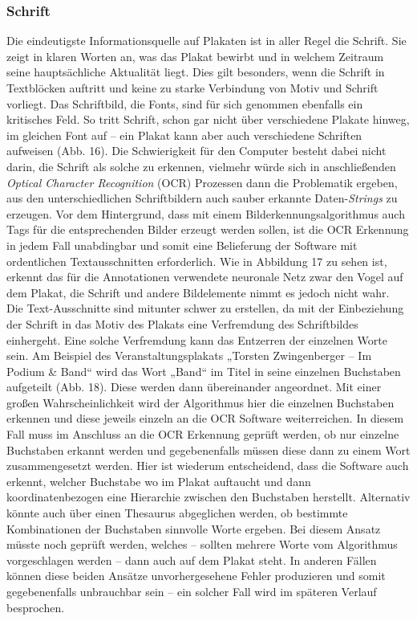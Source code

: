\documentclass[a4paper,12pt,ngerman]{article}
\begin{document}
\subsubsection{Schrift}
Die eindeutigste Informationsquelle auf Plakaten ist in aller Regel die Schrift. Sie zeigt in klaren Worten an, was das Plakat bewirbt und in welchem Zeitraum seine hauptsächliche Aktualität liegt. Dies gilt besonders, wenn die Schrift in Textblöcken auftritt und keine zu starke Verbindung von Motiv und Schrift vorliegt. Das Schriftbild, die Fonts, sind für sich genommen ebenfalls ein kritisches Feld. So tritt Schrift, schon gar nicht über verschiedene Plakate hinweg, im gleichen Font auf -- ein Plakat kann aber auch verschiedene Schriften aufweisen (Abb. 16). Die Schwierigkeit für den Computer besteht dabei nicht darin, die Schrift als solche zu erkennen, vielmehr würde sich in anschließenden \textit{Optical Character Recognition} (OCR) Prozessen dann die Problematik ergeben, aus den unterschiedlichen Schriftbildern auch sauber erkannte Daten-\textit{Strings} zu erzeugen. Vor dem Hintergrund, dass mit einem Bilderkennungsalgorithmus auch Tags für die entsprechenden Bilder erzeugt werden sollen, ist die OCR Erkennung in jedem Fall unabdingbar und somit eine Belieferung der Software mit ordentlichen Textausschnitten erforderlich. Wie in Abbildung 17 zu sehen ist, erkennt das für die Annotationen verwendete neuronale Netz zwar den Vogel auf dem Plakat, die Schrift und andere Bildelemente nimmt es jedoch nicht wahr. \\
Die Text-Ausschnitte sind mitunter schwer zu erstellen, da mit der Einbeziehung der Schrift in das Motiv des Plakats eine Verfremdung des Schriftbildes einhergeht. Eine solche Verfremdung kann das Entzerren der einzelnen Worte sein. Am Beispiel des Veranstaltungsplakats „Torsten Zwingenberger -- Im Podium \& Band“ wird das Wort „Band“ im Titel in seine einzelnen Buchstaben aufgeteilt (Abb. 18). Diese werden dann übereinander angeordnet. Mit einer großen Wahrscheinlichkeit wird der Algorithmus hier die einzelnen Buchstaben erkennen und diese jeweils einzeln an die OCR Software weiterreichen. In diesem Fall muss im Anschluss an die OCR Erkennung geprüft werden, ob nur einzelne Buchstaben erkannt werden und gegebenenfalls müssen diese dann zu einem Wort zusammengesetzt werden. Hier ist wiederum entscheidend, dass die Software auch erkennt, welcher Buchstabe wo im Plakat auftaucht und dann koordinatenbezogen eine Hierarchie zwischen den Buchstaben herstellt. Alternativ könnte auch über einen Thesaurus abgeglichen werden, ob bestimmte Kombinationen der Buchstaben sinnvolle Worte ergeben. Bei diesem Ansatz müsste noch geprüft werden, welches -- sollten mehrere Worte vom Algorithmus vorgeschlagen werden -- dann auch auf dem Plakat steht. In anderen Fällen können diese beiden Ansätze unvorhergesehene Fehler produzieren und somit gegebenenfalls unbrauchbar sein -- ein solcher Fall wird im späteren Verlauf besprochen. \\
\end{document}
